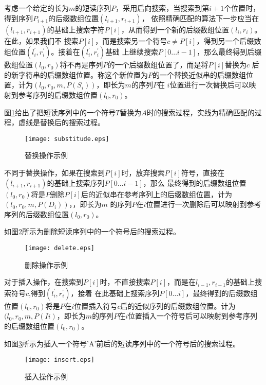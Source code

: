 考虑一个给定的长为$m$的短读序列$P$，采用后向搜索，当搜索到第$i+1$个位置时，得到序列$P_{i+1}$的后缀数组位置$(l_{i+1},r_{i+1})$，
依照精确匹配的算法下一步应当在$(l_{i+1},r_{i+1})$的基础上搜索字符$P[i]$，从而得到一个新的后缀数组位置$(l_i,r_i)$。在此，如果我们不
搜索$P[i]$，而是搜索另一个符号$c \neq P[i]$，得到另一个后缀数组位置$(l_{i}^{'},r_{i}^{'})$。接着在$(l_{i}^{'},r_{i}^{'})$基础
上继续搜索$P[0\ldots i-1]$，那么最终得到后缀数组位置$(l_0,r_0)$将不再是序列$P$的一个后缀数组位置了，而是将$P[i]$替换为$c$
后的新字符串的后缀数组位置。称这个新位置为$P$的一个替换近似串的后缀数组位置，计为$(l_0,r_0,m,P(S_i))$，即长为$m$的序列$P$在
$i$位置进行一次替换后可以映射到参考序列的后缀数组位置$(l_0,r_0)$。

图\ref{fig:substitude}给出了把短读序列中的一个符号$T$替换为$A$时的搜索过程，实线为精确匹配的过程，虚线是替换后的搜索过程。

\begin{figure}[htb]
    \centering
    \texttt{[image: substitude.eps]}
    \caption{替换操作示例} \label{fig:substitude}
\end{figure}

不同于替换操作，如果在搜索到$P[i]$时，放弃搜索$P[i]$符号，直接在$(l_{i+1},r_{i+1})$的基础上搜索序列$P[0\ldots i-1]$，那么
最终得到的后缀数组位置$(l_0,r_0)$将是$P$删除$P[i]$后的近似串在参考序列上的后缀数组位置，计为$(l_0,r_0,m,P(D_i))$，，即长为$m$
的序列$P$在$i$位置进行一次删除后可以映射到参考序列的后缀数组位置$(l_0,r_0)$。

如图\ref{fig:delete}所示为删除短读序列中的一个符号后的搜索过程。

\begin{figure}[htb]
    \centering
    \texttt{[image: delete.eps]}
    \caption{删除操作示例} \label{fig:delete}
\end{figure}

对于插入操作，在搜索到$P[i]$时，不直接搜索$P[i]$，而是在$l_{i-1},r_{i-1}$的基础上搜索符号$c$,得到$(l_{i}^{'},r_{i}^{'})$，接着
在此基础上搜索序列$P[0\ldots i]$，最终得到的后缀数组位置$(l_0,r_0)$将是$P$在$i$位置插入符号$c$后的近似序列的后缀数组位置。计为
$(l_0,r_0,m,P(Ii)$，即长为$m$的序列$P$在$i$位置插入一个符号后可以映射到参考序列的后缀数组位置$(l_0,r_0)$。

如图\ref{fig:insert}所示为插入一个符号'A'前后的短读序列中的一个符号后的搜索过程。

\begin{figure}[htb]
    \centering
    \texttt{[image: insert.eps]}
    \caption{插入操作示例} \label{fig:insert}
\end{figure}

